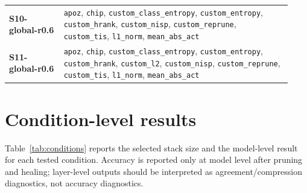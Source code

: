\documentclass[11pt]{article}
\newcommand{\stackname}[1]{\textbf{#1}}
\begin{document}
\begin{longtable}{p{0.18\linewidth}p{0.75\linewidth}}
\stackname{S10-global-r0.6} & \texttt{apoz}, \texttt{chip}, \texttt{custom\_class\_entropy}, \texttt{custom\_entropy}, \texttt{custom\_hrank}, \texttt{custom\_nisp}, \texttt{custom\_reprune}, \texttt{custom\_tis}, \texttt{l1\_norm}, \texttt{mean\_abs\_act} \\
\stackname{S11-global-r0.6} & \texttt{apoz}, \texttt{chip}, \texttt{custom\_class\_entropy}, \texttt{custom\_entropy}, \texttt{custom\_hrank}, \texttt{custom\_l2}, \texttt{custom\_nisp}, \texttt{custom\_reprune}, \texttt{custom\_tis}, \texttt{l1\_norm}, \texttt{mean\_abs\_act} \\
\bottomrule\end{longtable}

\section*{Condition-level results}
Table~\ref{tab:conditions} reports the selected stack size and the model-level result for each tested condition.  Accuracy is reported only at model level after pruning and healing; layer-level outputs should be interpreted as agreement/compression diagnostics, not accuracy diagnostics.
\end{document}
